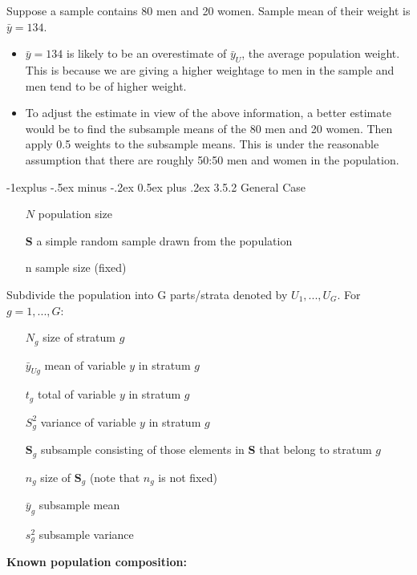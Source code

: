 \documentclass[10pt,landscape]{article}
\makeatletter
\renewcommand{\subsection}{\@startsection{subsection}{2}{0mm}%
                                {-1explus -.5ex minus -.2ex}%
                                {0.5ex plus .2ex}%
                                {\normalfont\normalsize\bfseries}}
\makeatother
\begin{document}
\begin{multicols}{3}
Suppose a sample contains 80 men and 20 women. Sample mean of their weight is $\bar{y} = 134$.

\begin{itemize}
  \item $\bar{y} = 134$ is likely to be an overestimate of $\bar{y}_{U}$, the average population weight. This is because we are giving a higher weightage to men in the sample and men tend to be of higher weight.
  \item To adjust the estimate in view of the above information, a better estimate would be to find the subsample means of the 80 men and 20 women. Then apply 0.5 weights to the subsample means. This is under the reasonable assumption that there are roughly 50:50 men and women in the population.
\end{itemize}

\subsection{3.5.2 General Case}

\begin{itemize}
  \item[$N$] population size
  \item[\textbf{S}] a simple random sample drawn from the population
  \item[n] sample size (fixed)
\end{itemize}

Subdivide the population into G parts/strata denoted by $U_{1}, ... , U_{G}$. For $g = 1,...,G$:

\begin{itemize}
  \item[$N_{g}$] size of stratum $g$
  \item[$\bar{y}_{Ug}$] mean of variable $y$ in stratum $g$
  \item[$t_{g}$] total of variable $y$ in stratum $g$
  \item[$S^{2}_{g}$] variance of variable $y$ in stratum $g$
  \item[$\textbf{S}_{g}$] subsample consisting of those elements in \textbf{S} that belong to stratum $g$
  \item[$n_{g}$] size of $\textbf{S}_{g}$ (note that $n_{g}$ is not fixed)
  \item[$\bar{y}_{g}$] subsample mean
  \item[$s^{2}_{g}$] subsample variance
\end{itemize}

\textbf{Known population composition:}


\end{multicols}
\end{document}
